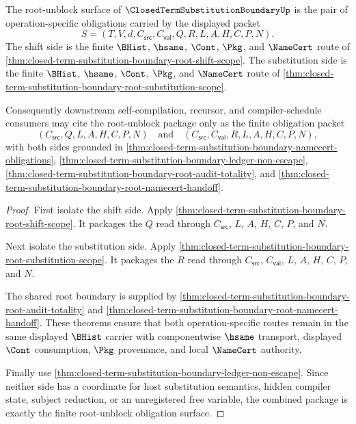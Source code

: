 \begin{theorem}
\label{thm:closed-term-substitution-boundary-root-unblock-obligation-package}
The root-unblock surface of $\ClosedTermSubstitutionBoundaryUp$ is the pair of operation-specific obligations carried by the displayed packet
$$
S=(T,V,d,C_{\mathsf{src}},C_{\mathsf{val}},Q,R,L,A,H,C,P,N).
$$
The shift side is the finite $\BHist$, $\hsame$, $\Cont$, $\Pkg$, and $\NameCert$ route of \autoref{thm:closed-term-substitution-boundary-root-shift-scope}. The substitution side is the finite $\BHist$, $\hsame$, $\Cont$, $\Pkg$, and $\NameCert$ route of \autoref{thm:closed-term-substitution-boundary-root-substitution-scope}.

Consequently downstream self-compilation, recursor, and compiler-schedule consumers may cite the root-unblock package only as the finite obligation packet
$$
(C_{\mathsf{src}},Q,L,A,H,C,P,N)
\quad\text{and}\quad
(C_{\mathsf{src}},C_{\mathsf{val}},R,L,A,H,C,P,N),
$$
with both sides grounded in \autoref{thm:closed-term-substitution-boundary-namecert-obligations}, \autoref{thm:closed-term-substitution-boundary-ledger-non-escape}, \autoref{thm:closed-term-substitution-boundary-root-audit-totality}, and \autoref{thm:closed-term-substitution-boundary-root-namecert-handoff}.
\end{theorem}
\begin{proof}
First isolate the shift side. Apply \autoref{thm:closed-term-substitution-boundary-root-shift-scope}. It packages the $Q$ read through $C_{\mathsf{src}}$, $L$, $A$, $H$, $C$, $P$, and $N$.

Next isolate the substitution side. Apply \autoref{thm:closed-term-substitution-boundary-root-substitution-scope}. It packages the $R$ read through $C_{\mathsf{src}}$, $C_{\mathsf{val}}$, $L$, $A$, $H$, $C$, $P$, and $N$.

The shared root boundary is supplied by \autoref{thm:closed-term-substitution-boundary-root-audit-totality} and \autoref{thm:closed-term-substitution-boundary-root-namecert-handoff}. These theorems ensure that both operation-specific routes remain in the same displayed $\BHist$ carrier with componentwise $\hsame$ transport, displayed $\Cont$ consumption, $\Pkg$ provenance, and local $\NameCert$ authority.

Finally use \autoref{thm:closed-term-substitution-boundary-ledger-non-escape}. Since neither side has a coordinate for host substitution semantics, hidden compiler state, subject reduction, or an unregistered free variable, the combined package is exactly the finite root-unblock obligation surface.
\end{proof}
